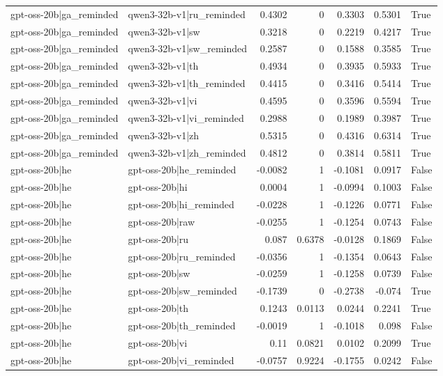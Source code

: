 \begin{table}
\begin{tabular}{l l r r r r l}
gpt-oss-20b|ga_reminded & qwen3-32b-v1|ru_reminded & 0.4302 & 0 & 0.3303 & 0.5301 & True \\
gpt-oss-20b|ga_reminded & qwen3-32b-v1|sw & 0.3218 & 0 & 0.2219 & 0.4217 & True \\
gpt-oss-20b|ga_reminded & qwen3-32b-v1|sw_reminded & 0.2587 & 0 & 0.1588 & 0.3585 & True \\
gpt-oss-20b|ga_reminded & qwen3-32b-v1|th & 0.4934 & 0 & 0.3935 & 0.5933 & True \\
gpt-oss-20b|ga_reminded & qwen3-32b-v1|th_reminded & 0.4415 & 0 & 0.3416 & 0.5414 & True \\
gpt-oss-20b|ga_reminded & qwen3-32b-v1|vi & 0.4595 & 0 & 0.3596 & 0.5594 & True \\
gpt-oss-20b|ga_reminded & qwen3-32b-v1|vi_reminded & 0.2988 & 0 & 0.1989 & 0.3987 & True \\
gpt-oss-20b|ga_reminded & qwen3-32b-v1|zh & 0.5315 & 0 & 0.4316 & 0.6314 & True \\
gpt-oss-20b|ga_reminded & qwen3-32b-v1|zh_reminded & 0.4812 & 0 & 0.3814 & 0.5811 & True \\
gpt-oss-20b|he & gpt-oss-20b|he_reminded & -0.0082 & 1 & -0.1081 & 0.0917 & False \\
gpt-oss-20b|he & gpt-oss-20b|hi & 0.0004 & 1 & -0.0994 & 0.1003 & False \\
gpt-oss-20b|he & gpt-oss-20b|hi_reminded & -0.0228 & 1 & -0.1226 & 0.0771 & False \\
gpt-oss-20b|he & gpt-oss-20b|raw & -0.0255 & 1 & -0.1254 & 0.0743 & False \\
gpt-oss-20b|he & gpt-oss-20b|ru & 0.087 & 0.6378 & -0.0128 & 0.1869 & False \\
gpt-oss-20b|he & gpt-oss-20b|ru_reminded & -0.0356 & 1 & -0.1354 & 0.0643 & False \\
gpt-oss-20b|he & gpt-oss-20b|sw & -0.0259 & 1 & -0.1258 & 0.0739 & False \\
gpt-oss-20b|he & gpt-oss-20b|sw_reminded & -0.1739 & 0 & -0.2738 & -0.074 & True \\
gpt-oss-20b|he & gpt-oss-20b|th & 0.1243 & 0.0113 & 0.0244 & 0.2241 & True \\
gpt-oss-20b|he & gpt-oss-20b|th_reminded & -0.0019 & 1 & -0.1018 & 0.098 & False \\
gpt-oss-20b|he & gpt-oss-20b|vi & 0.11 & 0.0821 & 0.0102 & 0.2099 & True \\
gpt-oss-20b|he & gpt-oss-20b|vi_reminded & -0.0757 & 0.9224 & -0.1755 & 0.0242 & False \\

\end{tabular}
\end{table}
